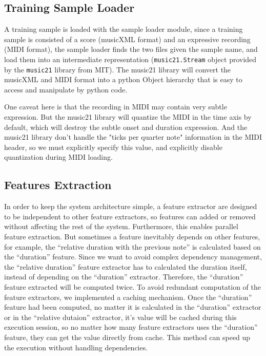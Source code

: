 
\subsection{Training Sample Loader}
   A training sample is loaded with the sample loader module, since a training sample is consisted of a score (musicXML format) and an expressive recording (MIDI format), the sample loader finds the two files given the sample name, and load them into an intermediate representation (\texttt{music21.Stream} object provided by the \texttt{music21} library\cite{music21} from MIT). The music21 library will convert the musicXML and MIDI format into a python Object hierarchy that is easy to access and manipulate by python code. 

One caveat here is that the recording in MIDI may contain very subtle expression. But the music21 library will quantize the MIDI in the time axis by default, which will destroy the subtle onset and duration expression. And the music21 library don't handle the "ticks per quarter note" information in the MIDI header\cite{midispec}, so we must explicitly specify this value, and explicitly disable quantization during MIDI loading.

\subsection{Features Extraction}
In order to keep the system architecture simple, a feature extractor are designed to be independent to other feature extractors, so features can added or removed without affecting the rest of the system. Furthermore, this enables parallel feature extraction. But sometimes a feature inevitably depends on other features, for example, the \enquote{relative duration with the previous note} is calculated based on the \enquote{duration} feature. Since we want to avoid complex dependency management, the \enquote{relative duration} feature extractor has to calculated the duration itself, instead of depending on the \enquote{duration} extractor. Therefore, the \enquote{duration} feature extracted will be computed twice. To avoid redundant computation of the feature extractors, we implemented a caching mechanism. Once the \enquote{duration} feature had been computed, no matter it is calculated in the \enquote{duration} extractor or in the \enquote{relative dutaion} extractor, it's value will be cached during this execution session, so no matter how many feature extractors uses the \enquote{duration} feature, they can get the value directly from cache. This method can speed up the execution without handling dependencies.

